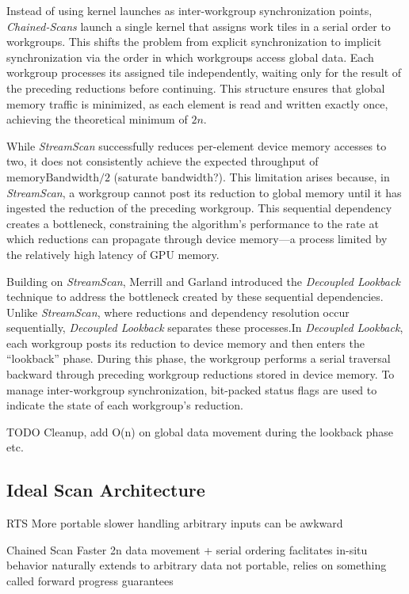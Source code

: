 \documentclass[sigconf]{acmart}
\begin{document}
Instead of using kernel launches as inter-workgroup synchronization points, \emph{Chained-Scans} launch a single kernel that assigns work tiles in a serial order to workgroups. This shifts the problem from explicit synchronization to implicit synchronization via the order in which workgroups access global data. Each workgroup processes its assigned tile independently, waiting only for the result of the preceding reductions before continuing. This structure ensures that global memory traffic is minimized, as each element is read and written exactly once, achieving the theoretical minimum of $2n$.

While \emph{StreamScan} successfully reduces per-element device memory accesses to two, it does not consistently achieve the expected throughput of $\text{memoryBandwidth}/2$ (saturate bandwidth?). This limitation arises because, in \emph{StreamScan}, a workgroup cannot post its reduction to global memory until it has ingested the reduction of the preceding workgroup. This sequential dependency creates a bottleneck, constraining the algorithm’s performance to the rate at which reductions can propagate through device memory—a process limited by the relatively high latency of GPU memory.

Building on \emph{StreamScan}, Merrill and Garland introduced the \emph{Decoupled Lookback} technique to address the bottleneck created by these sequential dependencies. Unlike \emph{StreamScan}, where reductions and dependency resolution occur sequentially, \emph{Decoupled Lookback} separates these processes.In \emph{Decoupled Lookback}, each workgroup posts its reduction to device memory and then enters the “lookback” phase. During this phase, the workgroup performs a serial traversal backward through preceding workgroup reductions stored in device memory. To manage inter-workgroup synchronization, bit-packed status flags are used to indicate the state of each workgroup’s reduction.

TODO Cleanup, add O(n) on global data movement during the lookback phase etc.

\subsection{Ideal Scan Architecture}
RTS
More portable
slower
handling arbitrary inputs can be awkward

Chained Scan
Faster
2n data movement + serial ordering faclitates in-situ behavior
naturally extends to arbitrary data
not portable, relies on something called forward progress guarantees
\end{document}
